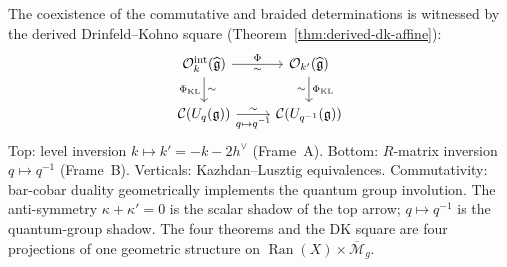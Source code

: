 \begin{remark}\label{rem:dk-inevitability}
The coexistence of the commutative and braided determinations is
witnessed by the derived
Drinfeld--Kohno square (Theorem~\ref{thm:derived-dk-affine}):
\begin{equation}\label{eq:dk-intro}
\begin{tikzcd}
\mathcal{O}_k^{\mathrm{int}}(\widehat{\mathfrak{g}})
  \ar[r, "\Phi", "\sim"']
  \ar[d, "\Phi_{\mathrm{KL}}"', "\sim"]
& \mathcal{O}_{k'}(\widehat{\mathfrak{g}})
  \ar[d, "\Phi_{\mathrm{KL}}", "\sim"']
\\
\mathcal{C}(U_q(\mathfrak{g}))
  \ar[r, "q \mapsto q^{-1}"', "\sim"]
& \mathcal{C}(U_{q^{-1}}(\mathfrak{g}))
\end{tikzcd}
\end{equation}
Top: level inversion $k \mapsto k' = -k - 2h^\vee$ (Frame~A).
Bottom: $R$-matrix inversion $q \mapsto q^{-1}$ (Frame~B).
Verticals: Kazhdan--Lusztig equivalences.  Commutativity: bar-cobar
duality geometrically implements the quantum group involution.
The anti-symmetry $\kappa + \kappa' = 0$ is the scalar shadow of
the top arrow; $q \mapsto q^{-1}$ is the quantum-group shadow.
The four theorems and the DK square are four projections of one
geometric structure on
$\operatorname{Ran}(X) \times \overline{\mathcal{M}}_g$.
\end{remark}

